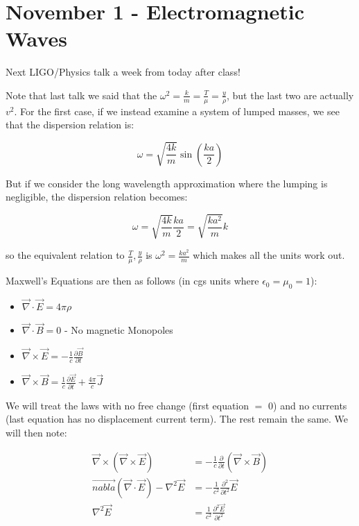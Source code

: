 \documentclass{report}
\begin{document}
\chapter{November 1 - Electromagnetic Waves}

Next LIGO/Physics talk a week from today after class!

Note that last talk we said that the $\omega^2 = \frac{k}{m} = \frac{T}{\mu} = \frac{y}{\rho}$, but the last two are actually $v^2$. For the first case, if we instead examine a system of lumped masses, we see that the dispersion relation is:

$$\omega = \sqrt{\frac{4k}{m}}\sin\left(\frac{ka}{2}\right)$$

But if we consider the long wavelength approximation where the lumping is negligible, the dispersion relation becomes:

$$\omega = \sqrt{\frac{4k}{m}}\frac{ka}{2} = \sqrt{\frac{ka^2}{m}}k$$

so the equivalent relation to $\frac{T}{\mu}, \frac{y}{\rho}$ is $\omega^2 = \frac{ka^2}{m}$ which makes all the units work out.

Maxwell's Equations are then as follows (in cgs units where $\epsilon_0 = \mu_0 = 1$):

\begin{itemize}
\item $\vec{\nabla}\cdot \vec{E} = 4\pi\rho$
\item $\vec{\nabla}\cdot \vec{B} = 0$ - No magnetic Monopoles
\item $\vec{\nabla}\times \vec{E} = -\frac{1}{c} \frac{\partial \vec{B}}{\partial t}$
\item $\vec{\nabla} \times \vec{B} = \frac{1}{c} \frac{\partial \vec{E}}{\partial t} + \frac{4\pi}{c}\vec{J}$
\end{itemize}

We will treat the laws with no free change (first equation $=$ 0) and no currents (last equation has no displacement current term). The rest remain the same. We will then note:

\begin{align*}
\vec{\nabla} \times (\vec{\nabla} \times \vec{E}) &= -\frac{1}{c} \frac{\partial}{\partial t}(\vec{\nabla} \times \vec{B})\\
\vec{nabla}(\vec{\nabla}\cdot \vec{E}) - \nabla^2 \vec{E} &= -\frac{1}{c^2} \frac{\partial^2}{\partial t^2}\vec{E}\\
\nabla^2\vec{E} &= \frac{1}{c^2}\frac{\partial^2 \vec{E}}{\partial t^2}
\end{align*}
\end{document}
